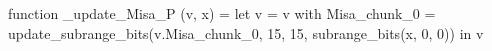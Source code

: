 function _update_Misa_P (v, x) = let v = { v with Misa_chunk_0 = update_subrange_bits(v.Misa_chunk_0, 15, 15, subrange_bits(x, 0, 0)) } in
  v
